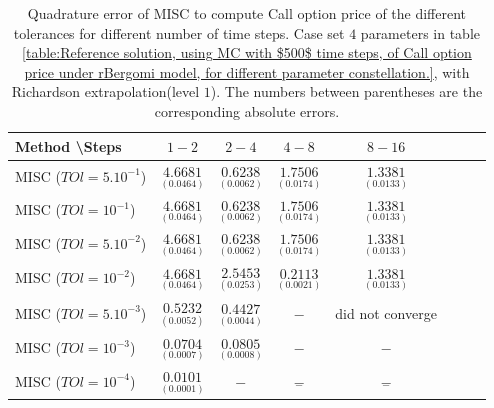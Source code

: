 \documentclass[11pt]{article}
\begin{document}
\begin{table}[h!]
\centering
\begin{tabular}{l*{6}{c}r}
Method \textbackslash  Steps            & $1-2$ & $2-4$ & $4-8$ & $8-16$  \\
\hline
MISC ($TOl=5.10^{-1}$)  & $\underset{(    0.0464)}{\mathbf{     4.6681
}}$ & $\underset{( 0.0062)}{\mathbf{  0.6238}}$ & $\underset{(  0.0174
	)}{\mathbf{
		1.7506}}$ & $\underset{(  0.0133
	)}{\mathbf{ 
		1.3381
}}$ \\
MISC ($TOl=10^{-1}$)  & $\underset{(    0.0464)}{\mathbf{     4.6681
}}$  & $\underset{( 0.0062)}{\mathbf{  0.6238}}$ & $\underset{(  0.0174
	)}{\mathbf{
		1.7506}}$ &  $\underset{(  0.0133
	)}{\mathbf{ 
		1.3381
}}$  \\
MISC ($TOl=5.10^{-2}$)  & $\underset{(    0.0464)}{\mathbf{     4.6681
}}$  & $\underset{( 0.0062)}{\mathbf{  0.6238}}$ & $\underset{(  0.0174
	)}{\mathbf{
		1.7506}}$ &  $\underset{(  0.0133
	)}{\mathbf{ 
		1.3381
}}$  \\
MISC ($TOl=10^{-2}$)  & $\underset{(    0.0464)}{\mathbf{     4.6681
}}$  & $\underset{(    0.0253)}{\mathbf{      2.5453
}}$ & $\underset{(     0.0021
	
	)}{\mathbf{
		0.2113}}$ &  $\underset{(  0.0133
	)}{\mathbf{ 
		1.3381
}}$ \\
MISC ($TOl=5.10^{-3}$)  & $\underset{(    0.0052 ) }{\mathbf{ 
		0.5232}}$ & $\underset{(0.0044)}{\mathbf{0.4427
}}$ &$-$ &  did not converge  \\
MISC ($TOl=10^{-3}$)  & $\underset{(0.0007 ) }{\mathbf{  0.0704  }}$ & $\underset{(0.0008)}{\mathbf{0.0805}}$ &$-$ & $-$ \\
MISC ($TOl=10^{-4}$)  & $\underset{(0.0001 ) }{\mathbf{   0.0101  
}}$ & $-$ &$\underset{-}{\mathbf{-}}$ & $\underset{-}{\mathbf{-}}$  \\
\hline
\end{tabular}
\caption{Quadrature error of MISC to compute Call option price of the different tolerances for different number of time steps. Case set $4$ parameters in table \ref{table:Reference solution, using MC with $500$ time steps, of Call option price under rBergomi model, for different parameter constellation.}, with Richardson extrapolation(level $1$). The numbers between parentheses are the corresponding absolute errors.}
\label{Quadrature error of MISC to compute Call option price of the different tolerances for different number of time steps. Case set $4$ parameters, with Richardson extrapolation(level $1$). The numbers between parentheses are the corresponding absolute errors,linear}
\end{table}
\end{document}
